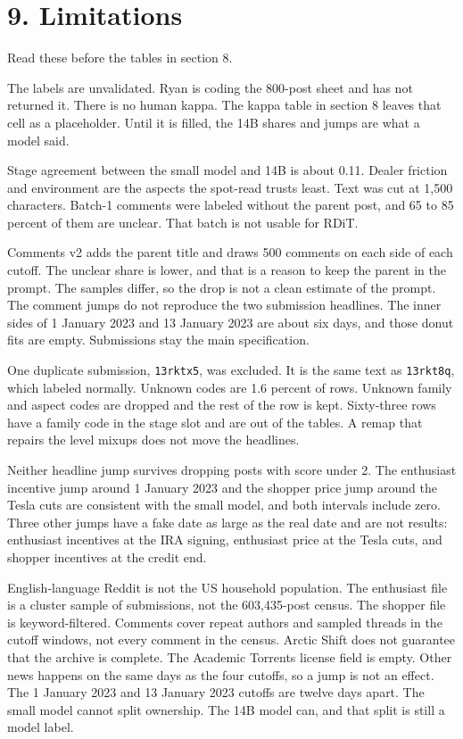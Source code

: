 \documentclass[11pt]{article}
\begin{document}
\section{9. Limitations}

Read these before the tables in section 8.


The labels are unvalidated. Ryan is coding the 800-post sheet and has not returned it. There is no human kappa. The kappa table in section 8 leaves that cell as a placeholder. Until it is filled, the 14B shares and jumps are what a model said.


Stage agreement between the small model and 14B is about 0.11. Dealer friction and environment are the aspects the spot-read trusts least. Text was cut at 1,500 characters. Batch-1 comments were labeled without the parent post, and 65 to 85 percent of them are unclear. That batch is not usable for RDiT.


Comments v2 adds the parent title and draws 500 comments on each side of each cutoff. The unclear share is lower, and that is a reason to keep the parent in the prompt. The samples differ, so the drop is not a clean estimate of the prompt. The comment jumps do not reproduce the two submission headlines. The inner sides of 1 January 2023 and 13 January 2023 are about six days, and those donut fits are empty. Submissions stay the main specification.


One duplicate submission, \texttt{13rktx5}, was excluded. It is the same text as \texttt{13rkt8q}, which labeled normally. Unknown codes are 1.6 percent of rows. Unknown family and aspect codes are dropped and the rest of the row is kept. Sixty-three rows have a family code in the stage slot and are out of the tables. A remap that repairs the level mixups does not move the headlines.


Neither headline jump survives dropping posts with score under 2. The enthusiast incentive jump around 1 January 2023 and the shopper price jump around the Tesla cuts are consistent with the small model, and both intervals include zero. Three other jumps have a fake date as large as the real date and are not results: enthusiast incentives at the IRA signing, enthusiast price at the Tesla cuts, and shopper incentives at the credit end.


English-language Reddit is not the US household population. The enthusiast file is a cluster sample of submissions, not the 603,435-post census. The shopper file is keyword-filtered. Comments cover repeat authors and sampled threads in the cutoff windows, not every comment in the census. Arctic Shift does not guarantee that the archive is complete. The Academic Torrents license field is empty. Other news happens on the same days as the four cutoffs, so a jump is not an effect. The 1 January 2023 and 13 January 2023 cutoffs are twelve days apart. The small model cannot split ownership. The 14B model can, and that split is still a model label.
\end{document}
